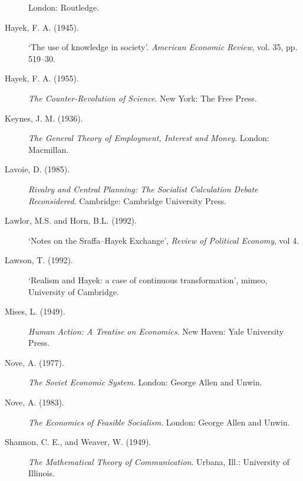 \begin{description}
London: Routledge.  
\item[Hayek, F. A. (1945).]`The use of knowledge in society'. 
{\it American Economic Review\/}, vol. 35, pp. 519--30. 
\item[Hayek, F. A. (1955).]{\it The Counter-Revolution of Science\/}.
New York: The Free Press.
\item[Keynes, J. M. (1936).]{\it The General Theory of Employment, Interest
and Money\/}. London: Macmillan.  
\item[Lavoie, D. (1985).]{\it Rivalry and Central Planning: The Socialist 
Calculation Debate Reconsidered\/}. Cambridge: Cambridge University Press.  
\item[Lawlor, M.S. and Horn, B.L. (1992).]`Notes on the Sraffa--Hayek 
Exchange', {\it Review of Political Economy\/}, vol 4.
\item[Lawson, T. (1992).]`Realism and Hayek: a case of continuous 
transformation', mimeo, University of Cambridge.
\item[Mises, L. (1949).]{\it Human Action: A Treatise on Economics\/}.
New Haven: Yale University Press.  
\item[Nove, A. (1977).]{\it The Soviet Economic System\/}.
London: George Allen and Unwin. 
\item[Nove, A. (1983).]{\it The Economics of Feasible Socialism\/}.
London: George Allen and Unwin.
\item[Shannon, C. E., and Weaver, W. (1949).]{\it The Mathematical Theory 
of Communication\/}. Urbana, Ill.: University of Illinois.
\end{description}

